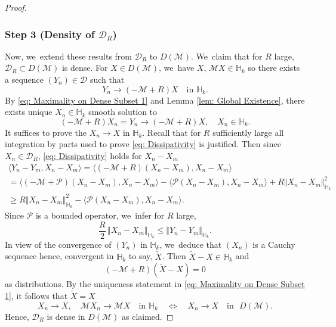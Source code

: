 \documentclass[10pt]{amsart}
\theoremstyle{plain}
\theoremstyle{definition}
\begin{document}
\begin{proof}
\subsubsection*{Step 3 (Density of $\mathcal D_R$)}
Now, we~extend these results from $\mathcal D_R$ to $D(\mathcal M)$. We~claim that for $R$ large, $\mathcal D_R\subset D(\mathcal M)$ is dense. For $X\in D(\mathcal M)$, we~have $X$, $\mathcal MX\in\mathbb H_k$ so there exists a sequence $(Y_n)\in \mathcal D$ such that
\[
Y_n\to (-\mathcal M+R)X\quad\text{in }\mathbb H_k.
\]
By \eqref{eq: Maximality on Dense Subset 1} and Lemma \ref{lem: Global Existence}, there exists unique $X_n\in\mathbb H_k$ smooth solution to
\[
(-\mathcal M+R)X_n=Y_n\to (-\mathcal M+R)X,\quad X_n\in \mathbb H_k.
\]
It suffices to prove the $X_n\to X$ in $\mathbb H_k$. Recall that for $R$ sufficiently large all integration by parts used to prove \eqref{eq: Dissipativity} is justified. Then since $X_n\in \mathcal D_R$, \eqref{eq: Dissipativity} holds for $X_n-X_m$ \ie\vspace*{-5pt}
\begin{multline*}
\langle Y_n-Y_m, X_n-X_m\rangle = \langle (-\mathcal M+R)(X_n-X_m), X_n-X_m\rangle \\
= \langle (-\mathcal M+\mathcal P)(X_n-X_m), X_n-X_m\rangle - \langle \mathcal P(X_n-X_m), X_n-X_m\rangle +R\Vert X_n-X_m\Vert _{\mathbb H_k}^2\\
\ge R\Vert X_n-X_m\Vert _{\mathbb H_k}^2 - \langle \mathcal P(X_n-X_m), X_n-X_m\rangle.
\end{multline*}
Since $\mathcal P$ is a bounded operator, we~infer for $R$ large,\vspace*{-3pt}
\[
\frac{R}{2}\,\Vert X_n-X_m\Vert_{\mathbb H_k}\le \Vert Y_n-Y_m\Vert_{\mathbb H_k}.
\]
In view of the convergence of $(Y_n)$ in $\mathbb H_k$, we~deduce that $(X_n)$ is a Cauchy sequence hence, convergent in $\mathbb H_k$ to say, $\tilde X$. Then $\tilde X-X\in\mathbb H_k$ and\vspace*{-3pt}
\[
(-\mathcal M+R)(\tilde X-X)=0
\]
as distributions. By the uniqueness statement in \eqref{eq: Maximality on Dense Subset 1}, it follows that $\tilde X=X$ \ie
\[
X_n\to X,\quad \mathcal MX_n\to\mathcal MX \quad\text{in }\mathbb H_k\quad \iff \quad X_n\to X\quad\text{in }\,\,D(\mathcal M).
\]
Hence, $\mathcal D_R$ is dense in $D(\mathcal M)$ as claimed.


\end{proof}
\end{document}
